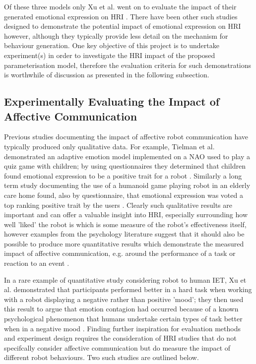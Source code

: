 \documentclass[11pt]{article}
\begin{document}
Of these three models only Xu et al. went on to evaluate the impact of their generated emotional expression on HRI \cite{xu2014robot}. There have been other such studies designed to demonstrate the potential impact of emotional expression on HRI however, although they typically provide less detail on the mechanism for behaviour generation. One key objective of this project is to undertake experiment(s) in order to investigate the HRI impact of the proposed parameterisation model, therefore the evaluation criteria for such demonstrations is worthwhile of discussion as presented in the following subsection.

\subsection{Experimentally Evaluating the Impact of Affective Communication}

Previous studies documenting the impact of affective robot communication have typically produced only qualitative data. For example, Tielman et al. demonstrated an adaptive emotion model implemented on a NAO used to play a quiz game with children; by using questionnaires they determined that children found emotional expression to be a positive trait for a robot \cite{tielman2014adaptive}. Similarly a long term study documenting the use of a humanoid game playing robot in an elderly care home found, also by questionnaire, that emotional expression was voted a top ranking positive trait by the users \cite{louie2012playing}. Clearly such qualitative results are important and can offer a valuable insight into HRI, especially surrounding how well 'liked' the robot is which is some measure of the robot's effectiveness itself, however examples from the psychology literature suggest that it should also be possible to produce more quantitative results which demonstrate the measured impact of affective communication, e.g. around the performance of a task \cite{barsade2002ripple} or reaction to an event \cite{latane1968group}.

In a rare example of quantitative study considering robot to human IET, Xu et al. demonstrated that participants performed better in a hard task when working with a robot displaying a negative rather than positive 'mood'; they then used this result to argue that emotion  contagion had occurred because of a known psychological phenomenon that humans undertake certain types of task better when in a negative mood \cite{xu2014robot}. Finding further inspiration for evaluation methods and experiment design requires the consideration of HRI studies that do not specifcally consider affective communication but do measure the impact of different robot behaviours. Two such studies are outlined below.
\end{document}
